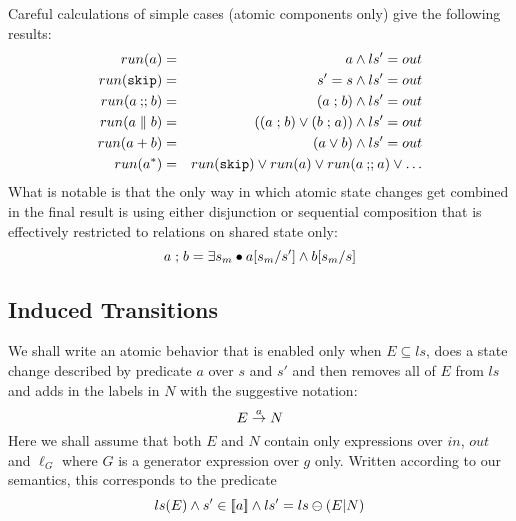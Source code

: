 Careful calculations of simple cases (atomic components only)
give the following results:
\begin{eqnarray*}
   run(a) &=& a \land ls'=out
\\ run(\texttt{skip}) &=& s'=s \land ls'=out
\\ run(a\mathbin{;\!;} b) &=& (a\mathrel{;} b) \land ls'=out
\\ run(a \parallel b) &=& ((a \mathrel{;} b) \lor (b \mathrel{;} a)) \land ls'=out
\\ run(a + b) &=& (a \lor b) \land ls'=out
\\ run(a^*) &=& run(\texttt{skip}) \lor run(a) \lor run(a\mathbin{;\!;} a) \lor \dots
\end{eqnarray*}
What is notable is that the only way in which atomic state changes
get combined in the final result is using either disjunction
or sequential composition
that is effectively restricted to relations on shared state only:
\[
  a \mathrel{;} b = \exists s_m \bullet a[s_m/s'] \land b[s_m/s]
\]


\subsection{Induced Transitions}

We shall write an atomic behavior
that is enabled only when $E \subseteq ls$,
does a state change described by predicate $a$ over $s$ and $s'$
and then removes all of $E$ from $ls$ and adds in the labels in $N$
with the suggestive notation:
\[
 E \stackrel{a}{\rightarrow} N
\]
Here we shall assume that both $E$ and $N$
contain only expressions over $in$, $out$ and $\ell_G$
where $G$ is a generator expression over $g$ only.
Written according to our semantics,
this corresponds to the predicate
\[
  ls(E) \land s' \in [\![{a}]\!] \land ls'=ls\ominus(E|N)
\]

